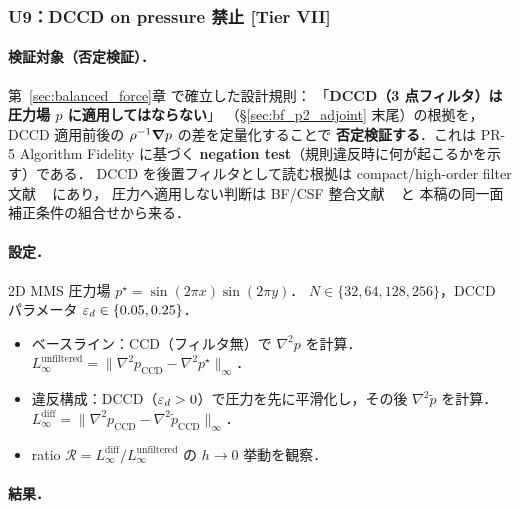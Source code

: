 %
\subsubsection{U9：DCCD on pressure 禁止 [Tier VII]}
\label{sec:U9_dccd_pressure_prohibition}

\paragraph{検証対象（否定検証）．}
第~\ref{sec:balanced_force}章 で確立した設計規則：
「\textbf{DCCD（3 点フィルタ）は圧力場 $p$ に適用してはならない}」
（§\ref{sec:bf_p2_adjoint} 末尾）の根拠を，
DCCD 適用前後の $\rho^{-1}\bm{\nabla} p$ の差を定量化することで
\textbf{否定検証する}．これは PR-5 Algorithm Fidelity に基づく
\textbf{negation test}（規則違反時に何が起こるかを示す）である．
DCCD を後置フィルタとして読む根拠は compact/high-order filter 文献
~\cite{Lele1992,GaitondeVisbal2000,VisbalGaitonde2002} にあり，
圧力へ適用しない判断は BF/CSF 整合文献
~\cite{Francois2006,Popinet2009,DennerVanWachem2015} と
本稿の同一面補正条件の組合せから来る．

\paragraph{設定．}
2D MMS 圧力場 $p^\star = \sin(2\pi x)\sin(2\pi y)$．
$N \in \{32, 64, 128, 256\}$，DCCD パラメータ $\varepsilon_d \in \{0.05, 0.25\}$．
\begin{itemize}\setlength{\itemsep}{0pt}
  \item ベースライン：CCD（フィルタ無）で $\nabla^2 p$ を計算．
        $L_\infty^{\mathrm{unfiltered}} = \|\nabla^2 p_{\mathrm{CCD}} - \nabla^2 p^\star\|_\infty$．
  \item 違反構成：DCCD（$\varepsilon_d > 0$）で圧力を先に平滑化し，その後 $\nabla^2 \tilde p$ を計算．
        $L_\infty^{\mathrm{diff}} = \|\nabla^2 p_{\mathrm{CCD}} - \nabla^2 \tilde p_{\mathrm{CCD}}\|_\infty$．
  \item ratio $\mathcal{R} = L_\infty^{\mathrm{diff}} / L_\infty^{\mathrm{unfiltered}}$ の
        $h \to 0$ 挙動を観察．
\end{itemize}

\paragraph{結果．}


